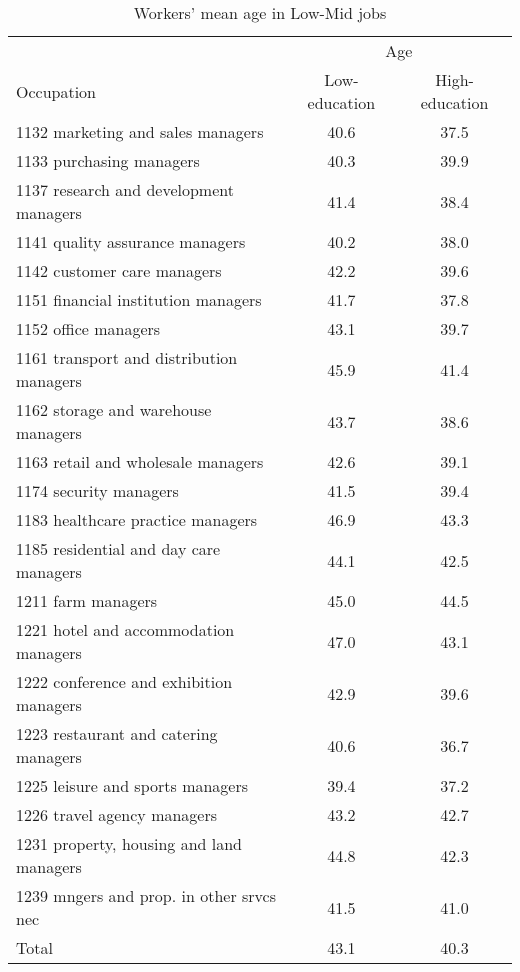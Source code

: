 \begin{table}
	\caption{Workers' mean age in Low-Mid jobs}
	\label{tab:ageProfile}
	\centering
	\begin{tabular}{lcc}
		\toprule
&\multicolumn{2}{c}{Age}\\
Occupation & Low-education & High-education\\
\midrule
1132 marketing and sales managers&40.6&37.5 \\
1133 purchasing managers&40.3&39.9 \\
1137 research and development managers&41.4&38.4 \\
1141 quality assurance managers&40.2&38.0 \\
1142 customer care managers&42.2&39.6 \\
1151 financial institution managers&41.7&37.8 \\
1152 office managers&43.1&39.7 \\
1161 transport and distribution managers&45.9&41.4 \\
1162 storage and warehouse managers&43.7&38.6 \\
1163 retail and wholesale managers&42.6&39.1 \\
1174 security managers&41.5&39.4 \\
1183 healthcare practice managers&46.9&43.3 \\
1185 residential and day care managers&44.1&42.5 \\
1211 farm managers&45.0&44.5 \\
1221 hotel and accommodation managers&47.0&43.1 \\
1222 conference and exhibition managers&42.9&39.6 \\
1223 restaurant and catering managers&40.6&36.7 \\
1225 leisure and sports managers&39.4&37.2 \\
1226 travel agency managers&43.2&42.7 \\
1231 property, housing and land managers&44.8&42.3 \\
1239 mngers and prop. in other srvcs nec&41.5&41.0 \\
Total&43.1&40.3 \\
\bottomrule
\bottomrule
\end{tabular}
\end{table}
